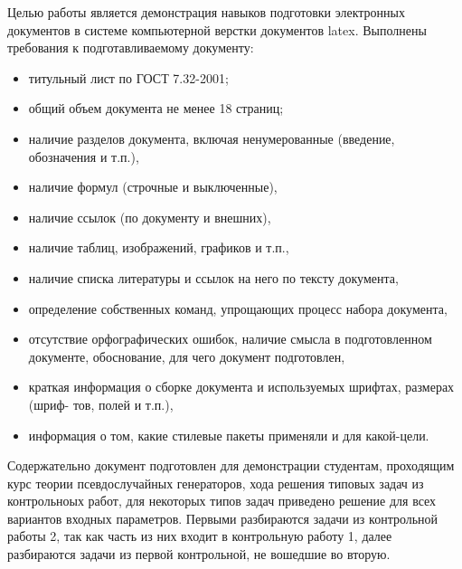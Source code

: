 \Introduction

Целью работы является демонстрация навыков подготовки электронных документов в системе компьютерной верстки документов latex. Выполнены требования к подготавливаемому документу:

\begin{itemize}
\item титульный лист по ГОСТ 7.32-2001;
\item общий объем документа не менее 18 страниц;
\item наличие разделов документа, включая ненумерованные (введение, обозначения и т.п.),
\item наличие формул (строчные и выключенные),
\item наличие ссылок (по документу и внешних),
\item наличие таблиц, изображений, графиков и т.п.,
\item наличие списка литературы и ссылок на него по тексту документа,
\item определение собственных команд, упрощающих процесс набора документа,
\item отсутствие орфографических ошибок, наличие смысла в подготовленном документе,
обоснование, для чего документ подготовлен,
\item краткая информация о сборке документа и используемых шрифтах, размерах (шриф-
тов, полей и т.п.),
\item информация о том, какие стилевые пакеты применяли и для какой-цели.
\end{itemize}

Содержательно документ подготовлен для демонстрации студентам, проходящим курс теории псевдослучайных генераторов, хода решения типовых задач из контрольноых работ, для некоторых типов задач приведено решение для всех вариантов входных параметров. Первыми разбираются задачи из контрольной работы 2, так как часть из них входит в контрольную работу 1, далее разбираются задачи из первой контрольной, не вошедшие во вторую.

